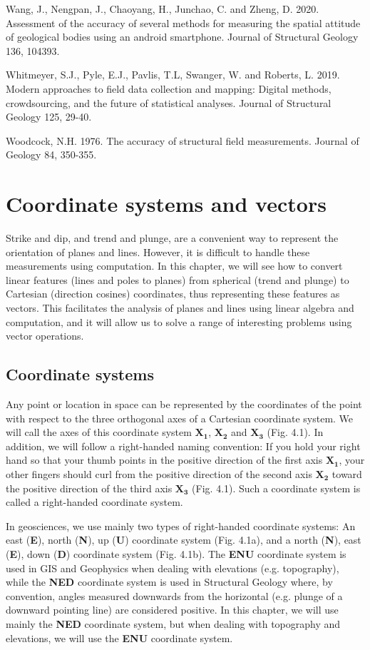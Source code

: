 \documentclass[a4paper , 12pt]{book}
\begin{document}
Wang, J., Nengpan, J., Chaoyang, H., Junchao, C. and Zheng, D. 2020. Assessment of the accuracy of several methods for measuring the spatial attitude of geological bodies using an android smartphone. Journal of Structural Geology 136, 104393.

Whitmeyer, S.J., Pyle, E.J., Pavlis, T.L, Swanger, W. and Roberts, L. 2019. Modern approaches to field data collection and mapping: Digital methods, crowdsourcing, and the future of statistical analyses. Journal of Structural Geology 125, 29-40.

Woodcock, N.H. 1976. The accuracy of structural field measurements. Journal of Geology 84, 350-355.

\chapter{Coordinate systems and vectors}

Strike and dip, and trend and plunge, are a convenient way to represent the orientation of planes and lines. However, it is difficult to handle these measurements using computation. In this chapter, we will see how to convert linear features (lines and poles to planes) from spherical (trend and plunge) to Cartesian (direction cosines) coordinates, thus representing these features as vectors. This facilitates the analysis of planes and lines using linear algebra and computation, and it will allow us to solve a range of interesting problems using vector operations.

\section{Coordinate systems}

Any point or location in space can be represented by the coordinates of the point with respect to the three orthogonal axes of a Cartesian coordinate system. We will call the axes of this coordinate system $\mathbf{X_1}$, $\mathbf{X_2}$ and $\mathbf{X_3}$ (Fig. 4.1). In addition, we will follow a right-handed naming convention: If you hold your right hand so that your thumb points in the positive direction of the first axis $\mathbf{X_1}$, your other fingers should curl from the positive direction of the second axis $\mathbf{X_2}$ toward the positive direction of the third axis $\mathbf{X_3}$ (Fig. 4.1). Such a coordinate system is called a right-handed coordinate system.

In geosciences, we use mainly two types of right-handed coordinate systems: An east (\textbf{E}), north (\textbf{N}), up (\textbf{U}) coordinate system (Fig. 4.1a), and a north (\textbf{N}), east (\textbf{E}), down (\textbf{D}) coordinate system (Fig. 4.1b). The \textbf{ENU} coordinate system is used in GIS and Geophysics when dealing with elevations (e.g. topography), while the \textbf{NED} coordinate system is used in Structural Geology where, by convention, angles measured downwards from the horizontal (e.g. plunge of a downward pointing line) are considered positive. In this chapter, we will use mainly the \textbf{NED} coordinate system, but when dealing with topography and elevations, we will use the \textbf{ENU} coordinate system.
\end{document}
